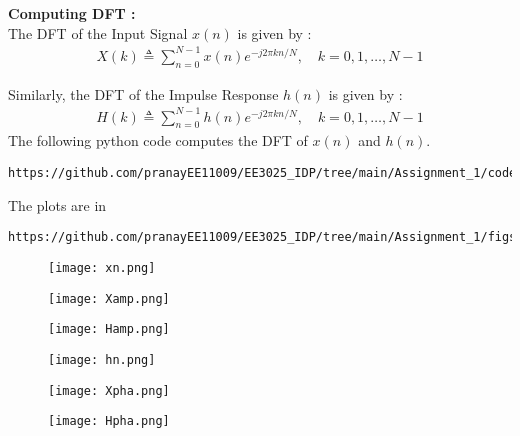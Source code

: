 \documentclass[journal,12pt,twocolumn]{IEEEtran}
\begin{document}
\large{ \bf Computing DFT :} \\
The DFT of the Input Signal $x(n)$ is given by :
\begin{align}
    X(k) \triangleq \sum_{n=0}^{N-1}x(n)e^{-j2\pi kn/N},\quad k=0,1, \ldots, N-1 
\end{align}

Similarly, the DFT of the Impulse Response $h(n)$ is given by :
\begin{align}
    H(k) \triangleq \sum_{n=0}^{N-1}h(n)e^{-j2\pi kn/N},\quad k=0,1, \ldots, N-1 
\end{align}
The following python code computes the DFT of $x(n)$ and $h(n)$.
\begin{lstlisting}
https://github.com/pranayEE11009/EE3025_IDP/tree/main/Assignment_1/codes
\end{lstlisting}
The plots are in
\begin{lstlisting}
https://github.com/pranayEE11009/EE3025_IDP/tree/main/Assignment_1/figs
\end{lstlisting}

\newpage

\begin{figure}[h!]
    \centering
    \texttt{[image: xn.png]}
    \label{figs}
\end{figure}

\begin{figure}[h!]
    \centering
    \texttt{[image: Xamp.png]}
    \label{figs}
\end{figure}

\begin{figure}[h!]
    \centering
    \texttt{[image: Hamp.png]}
    \label{figs}
\end{figure}

\begin{figure}[h!]
    \centering
    \texttt{[image: hn.png]}
    \label{figs}
\end{figure}
\vspace{1cm}
\begin{figure}[h!]
    \centering
    \texttt{[image: Xpha.png]}
    \label{figs}
\end{figure}

\begin{figure}[h!]
    \centering
    \texttt{[image: Hpha.png]}
    \label{figs}
\end{figure}
\end{document}
